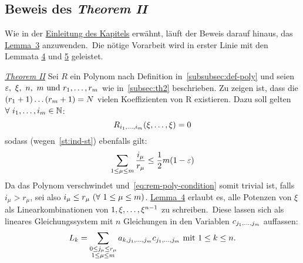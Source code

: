     
    
    \subsection{Beweis des \emph{Theorem II}}
        \label{subsec:proof-th2}
        \textrm{Wie in der \hyperref[sec:th2]{Einleitung des Kapitels} erwähnt, läuft der Beweis darauf hinaus, das
        \hyperref[subsec:lemma3]{Lemma~3} anzuwenden.\ Die nötige Vorarbeit wird in erster Linie mit den Lemmata
        \hyperref[subsec:lemma4]{4} und \hyperref[subsec:lemma5]{5} geleistet.}
        \newline
        \begin{namedproof}{\emph{\hyperref[subsec:th2]{Theorem II}}}
            Sei $R$ ein Polynom nach Definition in~\ref{subsubsec:def-poly} und seien $\varepsilon,\ \xi,\ n,\ m \ \textrm{und}\  r_1, \dots, r_m$ wie in~\ref{subsec:th2} beschrieben.
            \newline
            Zu zeigen ist, dass die $(r_1+1) \dots (r_m+1) = N$ vielen Koeffizienten von R existieren.
            \newline 
            Dazu soll gelten $\forall \ i_1, \dots, i_m \in \mathbb{N}$:
            \begin{equation}
                R_{i_1, \dots, i_m}(\xi, \dots, \xi) = 0 \label{eq:rem-poly-condition}
            \end{equation}
            sodass (wegen~\ref{st:ind-st}) ebenfalls gilt:
            \begin{equation}
                \sum_{1 \leq \mu \leq m} \frac{i_\mu}{r_\mu} \leq \frac{1}{2} m(1 - \varepsilon) \label{eq:ind-condition}
            \end{equation}
            Da das Polynom verschwindet und~\eqref{eq:rem-poly-condition} somit trivial ist, falls $i_\mu > r_\mu$, sei
            also $i_\mu \leq r_\mu \ (\forall \  1 \leq \mu \leq m)$.
            \newline
            \hyperref[subsec:lemma4]{Lemma~4} erlaubt es, alle Potenzen von $\xi$ als Linearkombinationen von $1, \xi, \dots, \xi^{n-1}$ zu schreiben.\ Diese lassen sich als lineares Gleichungssystem mit $n$ Gleichungen in den
            Variablen $c_{j_1, \dots, j_m}$ auffassen:
            \begin{equation*}
                L_k = \sum_{\substack{0 \leq j_\mu \leq r_\mu \\ 1 \leq \mu \leq m}} a_{k, \enum{j_1}{j_m}} c_{\enum{j_1}
                {j_m}} \sptext{mit} 1 \leq k \leq n.

\end{equation*}
\end{namedproof}

